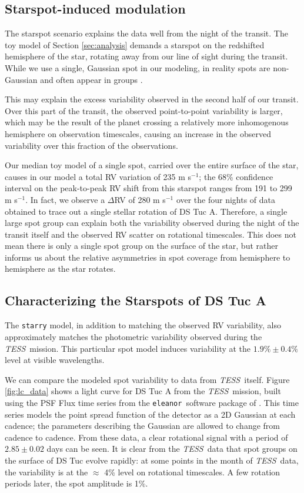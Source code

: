 \documentclass[twocolumn]{aastex63}
\newcommand{\tess}{{\it TESS}}
\newcommand{\eleanor}{\texttt{eleanor}}
\begin{document}
\subsection{Starspot-induced modulation}

The starspot scenario explains the data well from the night of the transit.
The toy model of Section \ref{sec:analysis} demands a starspot on the redshifted hemisphere of the star, rotating away from our line of sight during the transit. 
While we use a single, Gaussian spot in our modeling, in reality spots are non-Gaussian and often appear in groups \citep[e.g.][]{Kilcik11}.

This may explain the excess variability observed in the second half of our transit. 
Over this part of the transit, the observed point-to-point variability is larger, which may be the result of the planet crossing a relatively more inhomogenous hemisphere on observation timescales, causing an increase in the observed variability over this fraction of the observations.

Our median toy model of a single spot, carried over the entire surface of the star, causes in our model a total RV variation of 235 m s$^{-1}$; the 68\% confidence interval on the peak-to-peak RV shift from this starspot ranges from 191 to 299 m s$^{-1}$.
In fact, we observe a $\Delta$RV of 280 m s$^{-1}$ over the four nights of data obtained to trace out a single stellar rotation of DS Tuc A.
Therefore, a single large spot group can explain both the variability observed during the night of the transit itself and the observed RV scatter on rotational timescales.
This does not mean there is only a single spot group on the surface of the star, but rather informs us about the relative asymmetries in spot coverage from hemisphere to hemisphere as the star rotates.


\subsection{Characterizing the Starspots of DS Tuc A}
\label{sec:spots}
The \texttt{starry} model, in addition to matching the observed RV variability, also approximately matches the photometric variability observed during the \tess\ mission. 
This particular spot model induces variability at the $1.9\% \pm 0.4\%$ level at visible wavelengths.

We can compare the modeled spot variability to data from \tess\ itself. 
Figure \ref{fig:lc_data} shows a light curve for DS Tuc A from the \tess\ mission, built using the PSF Flux time series from the \eleanor\ software package of \citet{Feinstein19}. This time series models the point spread function of the detector as a 2D Gaussian at each cadence; the parameters describing the Gaussian are allowed to change from cadence to cadence. 
From these data, a clear rotational signal with a period of $2.85 \pm 0.02$ days can be seen.
It is clear from the \tess\ data that spot groups on the surface of DS Tuc evolve rapidly: at some points in the month of \tess\ data, the variability is at the $\approx$ 4\% level on rotational timescales. 
A few rotation periods later, the spot amplitude is 1\%. 
\end{document}
